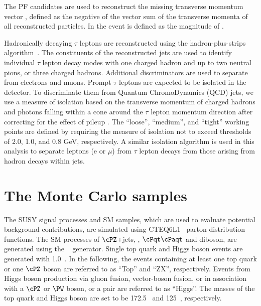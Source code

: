The PF candidates are used to reconstruct the missing transverse momentum  vector \ptvecmiss, defined as the negative of the vector sum of the transverse momenta of all reconstructed particles.  
In the event \MPT is defined as the magnitude of \ptvecmiss.

Hadronically decaying $\tau$ leptons are reconstructed using the hadron-plus-strips algorithm~\cite{Khachatryan:2015dfa}.
The constituents of the reconstructed jets are used to identify individual $\tau$ lepton decay modes with one charged 
hadron and up to two neutral pions, or three charged hadrons. 
Additional discriminators are used to separate \Tau from electrons and muons.
Prompt $\tau$ leptons are expected to be isolated in the detector.
To discriminate them from Quantum ChromoDynamics (QCD) jets, we use a measure of isolation 
based on the transverse momentum of charged hadrons and photons falling within 
a cone around the $\tau$ lepton momentum direction after correcting for the effect of
pileup \cite{Khachatryan:2014wca}. The ``loose'', ``medium'', and ``tight'' working points are defined
by requiring the measure of isolation not to exceed thresholds of 2.0, 1.0,
and 0.8 GeV, respectively.
 A similar isolation algorithm is 
used in this analysis to separate leptons (e or $\mu$) from $\tau$ lepton decays from 
those arising from hadron decays within jets.

\section{The Monte Carlo samples}
\label{sect:MCSamples}
The SUSY signal processes and SM samples, which are used to evaluate potential background contributions, are simulated using CTEQ6L1~\cite{Nadolsky:2008zw} parton distribution functions. The SM processes of $\cPZ$+jets, \wjets, $\cPqt\cPaqt$ and diboson, are generated using the ~\cite{Alwall:2011uj} generator. 
Single top quark and Higgs boson events are generated with {\POWHEG} 1.0~\cite{Nason:2004rx,Frixione:2007vw,Alioli:2009je,Alioli:2010xd}.
In the following, the events containing at least one top quark or one $\cPZ$ boson are referred to as ``Top'' and ``ZX'', respectively. 
Events from Higgs boson production via gluon fusion, vector-boson fusion, or in association with a $\cPZ$ or $\PW$ boson, or a \ttbar pair are referred to as ``Higgs''. The masses of the top quark and Higgs boson are set to be 172.5\GeV~\cite{Khachatryan:2015hba} and 125\GeV~\cite{Aad:2015zhl}, respectively. 

